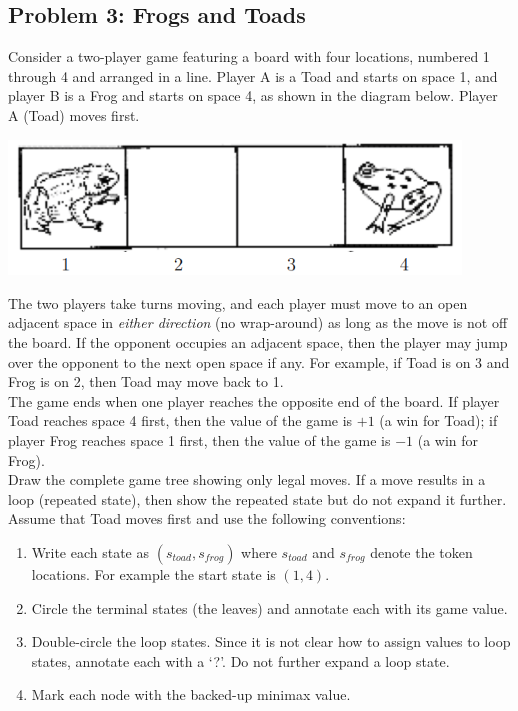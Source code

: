 \documentclass{math}
\begin{document}
\subsection*{Problem 3: Frogs and Toads}
Consider a two-player game featuring a board with four locations, numbered 1
through 4 and arranged in a line. Player A is a Toad and starts on space 1, and
player B is a Frog and starts on space 4, as shown in the diagram below. Player
A (Toad) moves first.
\begin{center}
  \includegraphics[width=12cm]{assets/frog_toad.png}
\end{center}
The two players take turns moving, and each player must move to an open
adjacent space in {\it either direction} (no wrap-around) as long as the move
is not off the board. If the opponent occupies an adjacent space, then the
player may jump over the opponent to the next open space if any. For example,
if Toad is on 3 and Frog is on 2, then Toad may move back to 1. \\[0.5cm]
The game ends when one player reaches the opposite end of the board.
If player Toad reaches space 4 first, then the value of the game is \( +1 \)
(a win for Toad); if player Frog reaches space 1 first, then the value of the
game is \( -1 \) (a win for Frog). \\[0.5cm]
Draw the complete game tree showing only legal moves. If a move results in a
loop (repeated state), then show the repeated state but do not expand it
further. Assume that Toad moves first and use the following conventions:
\begin{enumerate}
  \item Write each state as \( (s_{toad}, s_{frog}) \) where \( s_{toad} \) and
  \( s_{frog} \) denote the token locations. For example the start state is
  \( (1,4) \).
  \item Circle the terminal states (the leaves) and annotate each with its game
  value.
  \item Double-circle the loop states. Since it is not clear how to assign
  values to loop states, annotate each with a `?'.  Do not further expand a
  loop state.
  \item Mark each node with the backed-up minimax value.
\end{enumerate}
\end{document}
